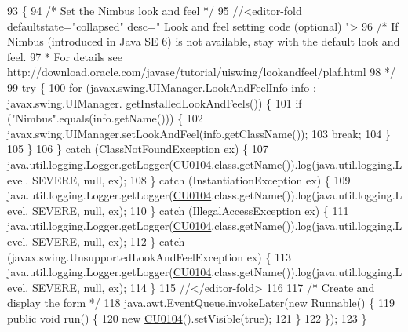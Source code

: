 \begin{DoxyCode}
93                                            \{
94         \textcolor{comment}{/* Set the Nimbus look and feel */}
95         \textcolor{comment}{//<editor-fold defaultstate="collapsed" desc=" Look and feel setting code (optional) ">}
96         \textcolor{comment}{/* If Nimbus (introduced in Java SE 6) is not available, stay with the default look and feel.}
97 \textcolor{comment}{         * For details see http://download.oracle.com/javase/tutorial/uiswing/lookandfeel/plaf.html }
98 \textcolor{comment}{         */}
99         \textcolor{keywordflow}{try} \{
100             \textcolor{keywordflow}{for} (javax.swing.UIManager.LookAndFeelInfo info : javax.swing.UIManager.
      getInstalledLookAndFeels()) \{
101                 \textcolor{keywordflow}{if} (\textcolor{stringliteral}{"Nimbus"}.equals(info.getName())) \{
102                     javax.swing.UIManager.setLookAndFeel(info.getClassName());
103                     \textcolor{keywordflow}{break};
104                 \}
105             \}
106         \} \textcolor{keywordflow}{catch} (ClassNotFoundException ex) \{
107             java.util.logging.Logger.getLogger(\mbox{\hyperlink{classinterfacessoguar_1_1_c_u0104_a0c70e4d803dc65276f8109fa7f5b9896}{CU0104}}.class.getName()).log(java.util.logging.Level.
      SEVERE, null, ex);
108         \} \textcolor{keywordflow}{catch} (InstantiationException ex) \{
109             java.util.logging.Logger.getLogger(\mbox{\hyperlink{classinterfacessoguar_1_1_c_u0104_a0c70e4d803dc65276f8109fa7f5b9896}{CU0104}}.class.getName()).log(java.util.logging.Level.
      SEVERE, null, ex);
110         \} \textcolor{keywordflow}{catch} (IllegalAccessException ex) \{
111             java.util.logging.Logger.getLogger(\mbox{\hyperlink{classinterfacessoguar_1_1_c_u0104_a0c70e4d803dc65276f8109fa7f5b9896}{CU0104}}.class.getName()).log(java.util.logging.Level.
      SEVERE, null, ex);
112         \} \textcolor{keywordflow}{catch} (javax.swing.UnsupportedLookAndFeelException ex) \{
113             java.util.logging.Logger.getLogger(\mbox{\hyperlink{classinterfacessoguar_1_1_c_u0104_a0c70e4d803dc65276f8109fa7f5b9896}{CU0104}}.class.getName()).log(java.util.logging.Level.
      SEVERE, null, ex);
114         \}
115         \textcolor{comment}{//</editor-fold>}
116 
117         \textcolor{comment}{/* Create and display the form */}
118         java.awt.EventQueue.invokeLater(\textcolor{keyword}{new} Runnable() \{
119             \textcolor{keyword}{public} \textcolor{keywordtype}{void} run() \{
120                 \textcolor{keyword}{new} \mbox{\hyperlink{classinterfacessoguar_1_1_c_u0104_a0c70e4d803dc65276f8109fa7f5b9896}{CU0104}}().setVisible(\textcolor{keyword}{true});
121             \}
122         \});
123     \}
\end{DoxyCode}


